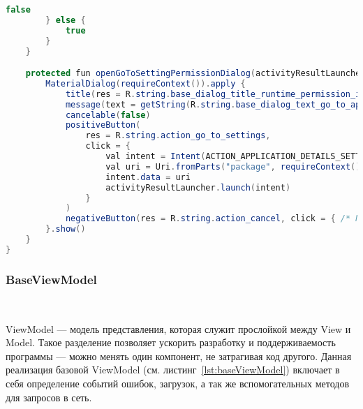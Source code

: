 \begin{lstlisting}[language=Java,label={lst:baseFragment},caption={Компонент BaseFragment}]
            false
        } else {
            true
        }
    }

    protected fun openGoToSettingPermissionDialog(activityResultLauncher: ActivityResultLauncher<Intent>) {
        MaterialDialog(requireContext()).apply {
            title(res = R.string.base_dialog_title_runtime_permission_is_denied)
            message(text = getString(R.string.base_dialog_text_go_to_application_settings))
            cancelable(false)
            positiveButton(
                res = R.string.action_go_to_settings,
                click = {
                    val intent = Intent(ACTION_APPLICATION_DETAILS_SETTINGS)
                    val uri = Uri.fromParts("package", requireContext().packageName, null)
                    intent.data = uri
                    activityResultLauncher.launch(intent)
                }
            )
            negativeButton(res = R.string.action_cancel, click = { /* Nothing */ })
        }.show()
    }
}
\end{lstlisting}

\subsubsection{BaseViewModel}~\par
ViewModel — модель представления, которая служит прослойкой между View и Model. Такое разделение позволяет ускорить разработку и поддерживаемость программы — можно менять один компонент, не затрагивая код другого. Данная реализация базовой ViewModel (см. листинг~\ref{lst:baseViewModel}) включает в себя определение событий ошибок, загрузок, а так же вспомогательных методов для запросов в сеть.


